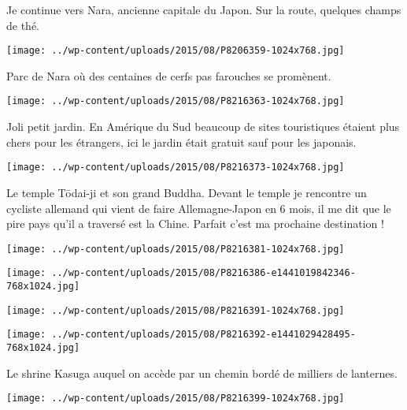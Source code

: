   Je continue vers Nara, ancienne capitale du Japon. Sur la route, quelques champs de thé. 
  \vspace{-2mm}
\begin{center} \texttt{[image: ../wp-content/uploads/2015/08/P8206359-1024x768.jpg]} \end{center}

  Parc de Nara où des centaines de cerfs pas farouches se promènent.
\begin{center} \texttt{[image: ../wp-content/uploads/2015/08/P8216363-1024x768.jpg]} \end{center}
\vspace{-\topsep}
\pagebreak
 
 Joli petit jardin. En Amérique du Sud beaucoup de sites touristiques étaient plus chers pour les étrangers, ici le jardin était gratuit sauf pour les japonais. 
\begin{center} \texttt{[image: ../wp-content/uploads/2015/08/P8216373-1024x768.jpg]} \end{center}

 Le temple Tōdai-ji et son grand Buddha. Devant le temple je rencontre un cycliste allemand qui vient de faire Allemagne-Japon en 6 mois, il me dit que le pire pays qu'il a traversé est la Chine. Parfait c'est ma prochaine destination !
\begin{center} \texttt{[image: ../wp-content/uploads/2015/08/P8216381-1024x768.jpg]} \end{center}
\begin{center} \texttt{[image: ../wp-content/uploads/2015/08/P8216386-e1441019842346-768x1024.jpg]} \end{center}
\begin{center} \texttt{[image: ../wp-content/uploads/2015/08/P8216391-1024x768.jpg]} \end{center}
 \begin{center} \texttt{[image: ../wp-content/uploads/2015/08/P8216392-e1441029428495-768x1024.jpg]} \end{center}

 Le shrine Kasuga auquel on accède par un chemin bordé de milliers de lanternes.
\begin{center} \texttt{[image: ../wp-content/uploads/2015/08/P8216399-1024x768.jpg]} \end{center}
\vspace{-\topsep}
\pagebreak

